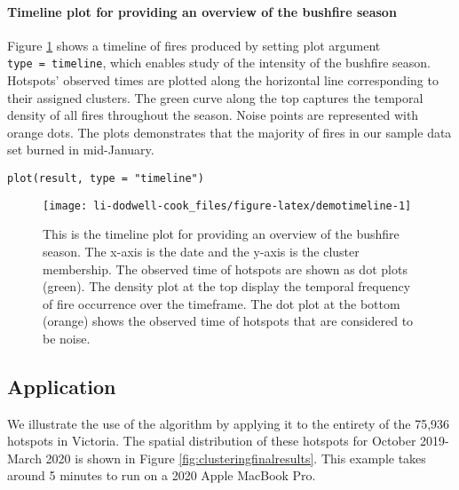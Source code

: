 \hypertarget{timeline-plot-for-providing-an-overview-of-the-bushfire-season}{%
\paragraph{Timeline plot for providing an overview of the bushfire season}\label{timeline-plot-for-providing-an-overview-of-the-bushfire-season}}

Figure \ref{fig:demotimeline} shows a timeline of fires produced by setting plot argument \texttt{type\ =\ \textquotesingle{}timeline\textquotesingle{}}, which enables study of the intensity of the bushfire season. Hotspots' observed times are plotted along the horizontal line corresponding to their assigned clusters. The green curve along the top captures the temporal density of all fires throughout the season. Noise points are represented with orange dots. The plots demonstrates that the majority of fires in our sample data set burned in mid-January.

\begin{verbatim}
plot(result, type = "timeline")
\end{verbatim}

\begin{figure}

{\centering \texttt{[image: li-dodwell-cook\_files/figure-latex/demotimeline-1]} 

}

\caption{This is the timeline plot for providing an overview of the bushfire season. The x-axis is the date and the y-axis is the cluster membership. The observed time of hotspots are shown as dot plots (green). The density plot at the top display the temporal frequency of fire occurrence over the timeframe. The dot plot at the bottom (orange) shows the observed time of hotspots that are considered to be noise.}\label{fig:demotimeline}
\end{figure}

\hypertarget{application}{%
\subsection{Application}\label{application}}

We illustrate the use of the algorithm by applying it to the entirety of the 75,936 hotspots in Victoria. The spatial distribution of these hotspots for October 2019-March 2020 is shown in Figure \ref{fig:clusteringfinalresults}. This example takes around 5 minutes to run on a 2020 Apple MacBook Pro.

